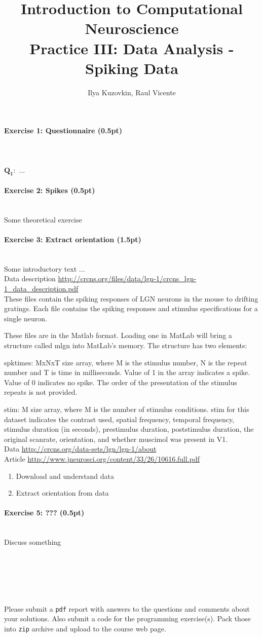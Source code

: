 \documentclass[a4paper,11pt]{article}
\author{\large{Ilya Kuzovkin, Raul Vicente}}
\title{\huge{Introduction to Computational Neuroscience}\\\LARGE{Practice III: Data Analysis - Spiking Data}}
\newenvironment{exercise}[3]{\paragraph{Exercise #1: #2 (#3pt)}\ \\}{
\medskip}
\newcommand{\question}[2]{\setlength\parindent{0mm}\ \\$\mathbf{Q_#1:}$ #2\ \\}
\begin{document}
\maketitle

\begin{exercise}{1}{Questionnaire}{0.5}
\question{1}{...}
\end{exercise}

\begin{exercise}{2}{Spikes}{0.5}
Some theoretical exercise
\end{exercise}

\begin{exercise}{3}{Extract orientation}{1.5}
Some introductory text ...\\
Data description \url{http://crcns.org/files/data/lgn-1/crcns_lgn-1_data_description.pdf}\\

These files contain the spiking responses of LGN neurons in the mouse to 
drifting gratings. Each file contains the spiking responses and stimulus 
specifications for a single neuron. 
 
These files are in the Matlab format. Loading one in MatLab will bring a structure 
called mlgn into MatLab's memory. The structure has two elements: 
 
spktimes: MxNxT size array, where M is the stimulus number, N is the repeat 
number and T is time in milliseconds. Value of 1 in the array indicates 
a spike. Value of 0 indicates no spike. The order of the presentation 
of the stimulus repeats is not provided. 
 
stim: M size array, where M is the number of stimulus conditions. 
stim for this dataset indicates the contrast used, spatial frequency, 
temporal frequency, stimulus duration (in seconds), prestimulus 
duration, poststimulus duration, the original scanrate, orientation, and 
whether muscimol was present in V1. 
\ \\



Data \url{http://crcns.org/data-sets/lgn/lgn-1/about}\\
Article \url{http://www.jneurosci.org/content/33/26/10616.full.pdf}
\begin{enumerate}
\itemsep 0em
	\item Download and understand data
	\item Extract orientation from data
\end{enumerate}
\end{exercise}

\begin{exercise}{5}{???}{0.5}
Discuss something
\end{exercise}



\ \\
\ \\
\ \\
\ \\
\ \\
Please submit a \texttt{pdf} report with answers to the questions and comments about your solutions. Also submit a code for the programming exercise(s). Pack those into \texttt{zip} archive and upload to the course web page.
\end{document}

